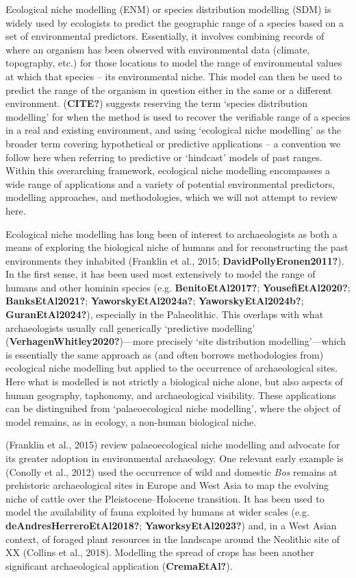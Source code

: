 \documentclass[
  number,
  review]{elsarticle}
\begin{document}
Ecological niche modelling (ENM) or species distribution modelling (SDM)
is widely used by ecologists to predict the geographic range of a
species based on a set of environmental predictors. Essentially, it
involves combining records of where an organism has been observed with
environmental data (climate, topography, etc.) for those locations to
model the range of environmental values at which that species -- its
environmental niche. This model can then be used to predict the range of
the organism in question either in the same or a different environment.
(\textbf{CITE?}) suggests reserving the term `species distribution
modelling' for when the method is used to recover the verifiable range
of a species in a real and existing environment, and using `ecological
niche modelling' as the broader term covering hypothetical or predictive
applications -- a convention we follow here when referring to predictive
or `hindcast' models of past ranges. Within this overarching framework,
ecological niche modelling encompasses a wide range of applications and
a variety of potential environmental predictors, modelling approaches,
and methodologies, which we will not attempt to review here.

Ecological niche modelling has long been of interest to archaeologists
as both a means of exploring the biological niche of humans and for
reconstructing the past environments they inhabited (Franklin et al.,
2015; \textbf{DavidPollyEronen2011?}). In the first sense, it has been
used most extensively to model the range of humans and other hominin
species (e.g. \textbf{BenitoEtAl2017?}; \textbf{YousefiEtAl2020?};
\textbf{BanksEtAl2021?}; \textbf{YaworskyEtAl2024a?};
\textbf{YaworskyEtAl2024b?}; \textbf{GuranEtAl2024?}), especially in the
Palaeolithic. This overlaps with what archaeologists usually call
generically `predictive modelling'
(\textbf{VerhagenWhitley2020?})---more precisely `site distribution
modelling'---which is essentially the same approach as (and often
borrows methodologies from) ecological niche modelling but applied to
the occurrence of archaeological sites. Here what is modelled is not
strictly a biological niche alone, but also aspects of human geography,
taphonomy, and archaeological visibility. These applications can be
distinguihed from `palaeoecological niche modelling', where the object
of model remains, as in ecology, a non-human biological niche.

(Franklin et al., 2015) review palaeoecological niche modelling and
advocate for its greater adoption in environmental archaeology. One
relevant early example is (Conolly et al., 2012) used the occurrence of
wild and domestic \emph{Bos} remains at prehistoric archaeological sites
in Europe and West Asia to map the evolving niche of cattle over the
Pleistocene--Holocene transition. It has been used to model the
availability of fauna exploited by humans at wider scales (e.g.
\textbf{deAndresHerreroEtAl2018?}; \textbf{YaworksyEtAl2023?}) and, in a
West Asian context, of foraged plant resources in the landscape around
the Neolithic site of XX (Collins et al., 2018). Modelling the spread of
crops has been another significant archaeological application
(\textbf{CremaEtAl?}).
\end{document}
